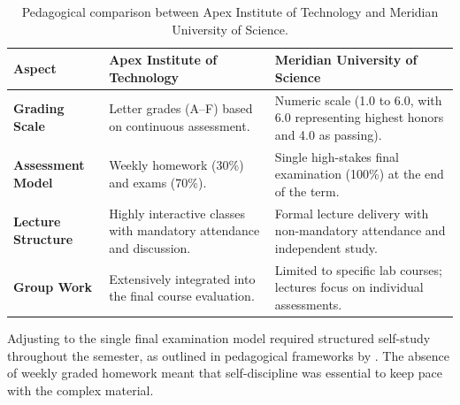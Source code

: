 \begin{table}[htbp]
  \centering
  \caption{Pedagogical comparison between Apex Institute of Technology and Meridian University of Science.}
  \label{tab:academic_comparison}
  \vspace{5pt}
  \begin{tabularx}{\textwidth}{>{\raggedright\arraybackslash\bfseries\color{primarycolor}}p{3cm} X X}
    \toprule
    \textbf{Aspect} & \textbf{Apex Institute of Technology} & \textbf{Meridian University of Science} \\
    \midrule
    \textbf{Grading Scale} & Letter grades (A--F) based on continuous assessment. & Numeric scale (1.0 to 6.0, with 6.0 representing highest honors and 4.0 as passing). \\
    \midrule
    \textbf{Assessment Model} & Weekly homework (30\%) and exams (70\%). & Single high-stakes final examination (100\%) at the end of the term. \\
    \midrule
    \textbf{Lecture Structure} & Highly interactive classes with mandatory attendance and discussion. & Formal lecture delivery with non-mandatory attendance and independent study. \\
    \midrule
    \textbf{Group Work} & Extensively integrated into the final course evaluation. & Limited to specific lab courses; lectures focus on individual assessments. \\
    \bottomrule
  \end{tabularx}
\end{table}

Adjusting to the single final examination model required structured self-study throughout the semester, as outlined in pedagogical frameworks by \cite{rostova2024crosscultural}. The absence of weekly graded homework meant that self-discipline was essential to keep pace with the complex material.
